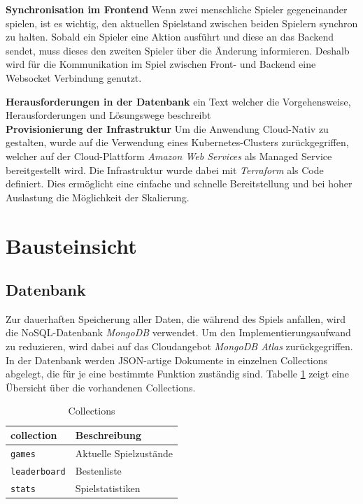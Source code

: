 \documentclass[a4paper, 10pt, conference]{IEEEtran}
\begin{document}
\textbf{Synchronisation im Frontend}
Wenn zwei menschliche Spieler gegeneinander spielen, ist es wichtig, den aktuellen Spielstand zwischen beiden Spielern synchron zu halten. Sobald ein Spieler eine Aktion ausführt und diese an das Backend sendet, muss dieses den zweiten Spieler über die Änderung informieren. Deshalb wird für die Kommunikation im Spiel zwischen Front- und Backend eine Websocket Verbindung genutzt.

\textbf{Herausforderungen in der Datenbank} 
ein Text welcher die Vorgehensweise, Herausforderungen und Lösungswege beschreibt\\
\textbf{Provisionierung der Infrastruktur} 
Um die Anwendung Cloud-Nativ zu gestalten, wurde auf die Verwendung eines Kubernetes-Clusters zurückgegriffen, welcher auf der Cloud-Plattform \textit{Amazon Web Services} als Managed Service bereitgestellt wird. Die Infrastruktur wurde dabei mit \textit{Terraform} als Code definiert. Dies ermöglicht eine einfache und schnelle Bereitstellung und bei hoher Auslastung die Möglichkeit der Skalierung.\\

\section{Bausteinsicht}\label{sec:bausteinsicht}



\subsection{Datenbank}\label{subsec:datenbank}
Zur dauerhaften Speicherung aller Daten, die während des Spiels anfallen, wird die NoSQL-Datenbank \textit{MongoDB} \cite{mongodb} verwendet. Um den Implementierungsaufwand zu reduzieren, wird dabei auf das Cloudangebot \textit{MongoDB Atlas} \cite{mongodb-atlas} zurückgegriffen. In der Datenbank werden JSON-artige Dokumente in einzelnen Collections abgelegt, die für je eine bestimmte Funktion zuständig sind. Tabelle \ref{tab:collections} zeigt eine Übersicht über die vorhandenen Collections.

\begin{table}[h!]
    \begin{center}
        \caption{Collections}
        \label{tab:collections}
        \begin{tabular}{|l|l|}
            \textbf{collection} & \textbf{Beschreibung}\\
            \hline
            \texttt{games}				& Aktuelle Spielzustände\\
            \texttt{leaderboard}					& Bestenliste\\
            \texttt{stats}	& Spielstatistiken\\
        \end{tabular}
    \end{center}
\end{table}
\end{document}
